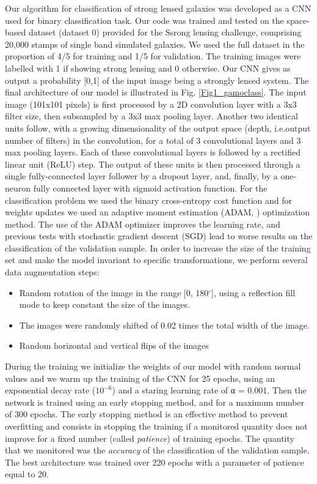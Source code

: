\documentclass[useAMS,usenatbib]{mnras}
\newcommand{\degree}{^{\circ}}
\begin{document}
Our algorithm for classification of strong lensed galaxies was developed as a CNN used for binary classification task.
Our code was trained and tested on the space-based dataset (dataset 0) provided for the Ssrong lensing challenge, comprising 20,000 stamps of single band simulated galaxies. We used the full dataset in the proportion of 4/5 for training and 1/5 for validation. The training images were labelled with 1 if showing strong lensing and 0 otherwise. Our CNN gives as output a probability [0,1] of the input image being a strongly lensed system.
The final architecture of our model is illustrated in Fig. \ref{Fig1_gamoclass}. The input image (101x101 pixels) is first processed by a 2D convolution layer with a 3x3 filter size, then subsampled by a 3x3 max pooling layer.  Another two identical units follow, with a growing dimensionality of the output space (depth, i.e.output number of filters) in the convolution, for a total of 3 convolutional layers and 3 max pooling layers. Each of these convolutional layers is followed by a rectified linear unit (ReLU) step. The output of these units is then processed through a single fully-connected layer follower by a dropout layer, and, finally, by a one-neuron fully connected layer with sigmoid activation function. For the classification problem we used the binary cross-entropy cost function and for weights updates we used an adaptive moment estimation (ADAM, \citealt{Kingma_2014}) optimization method. The use of the ADAM optimizer improves the learning rate, and previous tests with stochastic gradient descent (SGD) lead to worse results on the classification of the validation sample.
In order to increase the size of the training set and make the model invariant to specific transformations, we perform several data augmentation steps:
\begin{itemize}
\item Random rotation of the image in the range [0, 180$\degree$], using a reflection fill mode to keep constant the size of the images.
\item The images were randomly shifted of 0.02 times the total width of the image.
\item Random horizontal and vertical flips of the images
\end{itemize}
During the training we initialize the weights of our model with random normal values and we warm up the training \citet{Huang_2016} of the CNN for 25 epochs, using an exponential decay rate ($10^{-6}$) and a staring learning rate of α = 0.001. Then the network is trained using an early stopping method, and for a maximum number of 300 epochs. The early stopping method is an effective method to prevent overfitting and consists in stopping the training if a monitored quantity does not improve for a fixed number (called \textit{patience}) of training epochs. The quantity that we monitored was the \textit{accuracy} of the classification of the validation sample. The best architecture was trained over 220 epochs with a parameter of patience equal to 20.
\end{document}
